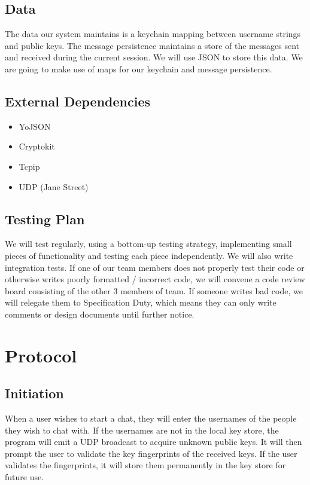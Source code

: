 \documentclass[a4paper]{article}
\begin{document}
\subsection{Data}
The data our system maintains is a keychain mapping between username strings and public keys. The message persistence maintains a store of the messages sent and received during the current session. We will use JSON to store this data. We are going to make use of maps for our keychain and message persistence. 

\subsection{External Dependencies}
\begin{itemize}
	\item YoJSON
	\item Cryptokit
	\item Tcpip
	\item UDP (Jane Street)
\end{itemize}

\subsection{Testing Plan}
We will test regularly, using a bottom-up testing strategy, implementing small pieces of functionality and testing each piece independently. We will also write integration tests. If one of our team members does not properly test their code or otherwise writes poorly formatted / incorrect code, we will convene a code review board consisting of the other 3 members of team. If someone writes bad code, we will relegate them to Specification Duty, which means they can only write comments or design documents until further notice.

\section{Protocol}
\subsection{Initiation}
When a user wishes to start a chat, they will enter the usernames of the people they wish to chat with. If the usernames are not in the local key store, the program will emit a UDP broadcast to acquire unknown public keys. It will then prompt the user to validate the key fingerprints of the received keys. If the user validates the fingerprints, it will store them permanently in the key store for future use.
\end{document}
